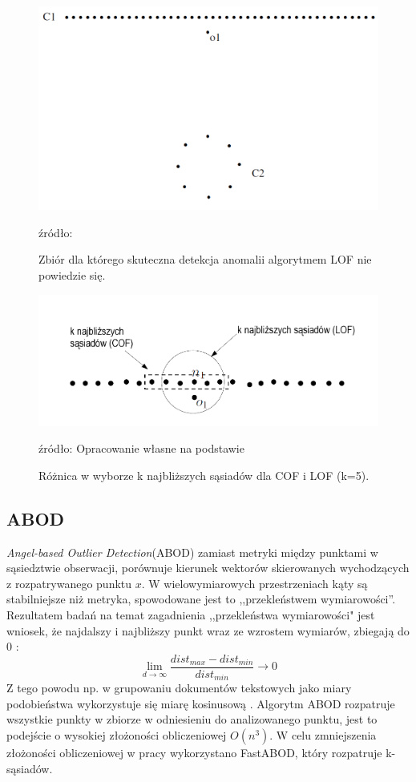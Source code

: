 \begin{figure}
    \centering
    \includegraphics[width=.7\textwidth]{chapters/MetaOD/images/cof.png}
    \caption{Zbiór dla którego skuteczna detekcja anomalii algorytmem LOF nie powiedzie się.}
    \footnotesize{źródło: \cite{cof}}
    \label{fig:cof}
\end{figure}

\begin{figure}
    \centering
    \includegraphics[width=.8\textwidth]{chapters/MetaOD/images/lvcof.png}
    \caption{Różnica w wyborze k najbliższych sąsiadów dla COF i LOF (k=5).}
    \footnotesize{źródło: Opracowanie własne na podstawie  \cite{chandola2009anomaly}}
    \label{fig:lcof}
\end{figure}

\subsection{ABOD}
\label{abod}
\textit{Angel-based Outlier Detection}(ABOD) \cite{abod} zamiast metryki między punktami w sąsiedztwie obserwacji, porównuje kierunek wektorów skierowanych wychodzących z rozpatrywanego punktu $x$.  W wielowymiarowych przestrzeniach kąty są stabilniejsze niż metryka, spowodowane jest to ,,przekleństwem wymiarowości''. Rezultatem badań na temat zagadnienia ,,przekleństwa wymiarowości"\cite{curse} jest wniosek, że najdalszy i najbliższy punkt wraz ze wzrostem wymiarów, zbiegają do 0 :
\begin{equation}
\lim_{d\to\infty} \frac{dist_{max} - dist_{min}}{dist_{min}} \longrightarrow 0
\end{equation}
Z tego powodu np. w grupowaniu dokumentów tekstowych jako miary podobieństwa wykorzystuje się miarę kosinusową \cite{huang2008similarity}. Algorytm ABOD rozpatruje wszystkie punkty w zbiorze w odniesieniu do analizowanego punktu, jest to podejście o wysokiej złożoności obliczeniowej $O(n^3)$. W celu zmniejszenia złożoności obliczeniowej w pracy wykorzystano FastABOD, który rozpatruje k-sąsiadów.

